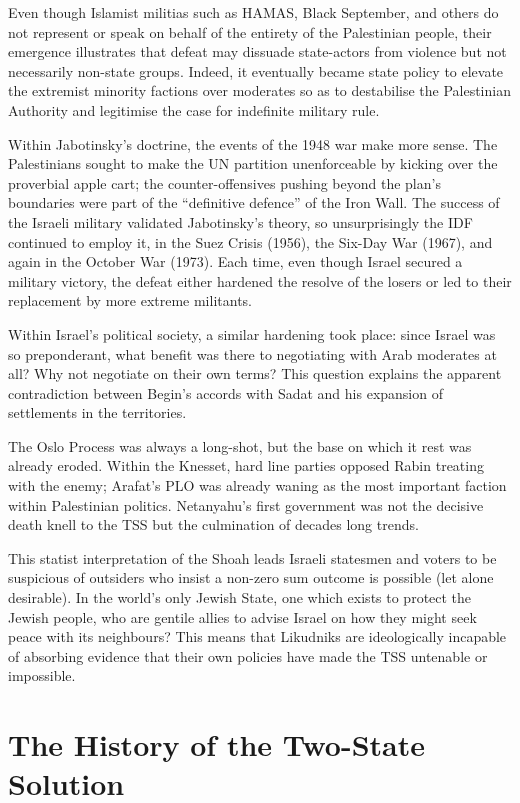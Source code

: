 \documentclass[letterpaper,12pt,twoside]{article} %
\begin{document}
\begin{multicols}{2}
Even though Islamist militias such as HAMAS, Black September, and others do not represent or speak on behalf of the entirety of the Palestinian people, their emergence illustrates that defeat may dissuade state-actors from violence but not necessarily non-state groups. Indeed, it eventually became state policy to elevate the extremist minority factions over moderates so as to destabilise the Palestinian Authority and legitimise the case for indefinite military rule.

Within Jabotinsky's doctrine, the events of the 1948 war make more sense. The Palestinians sought to make the UN partition unenforceable by kicking over the proverbial apple cart; the counter-offensives pushing beyond the plan's boundaries were part of the ``definitive defence'' of the Iron Wall. The success of the Israeli military validated Jabotinsky's theory, so unsurprisingly the IDF continued to employ it, in the Suez Crisis (1956), the Six-Day War (1967), and again in the October War (1973). Each time, even though Israel secured a military victory, the defeat either hardened the resolve of the losers or led to their replacement by more extreme militants.

Within Israel's political society, a similar hardening took place: since Israel was so preponderant, what benefit was there to negotiating with Arab moderates at all? Why not negotiate on their own terms? This question explains the apparent contradiction between Begin's accords with Sadat and his expansion of settlements in the territories.

The Oslo Process was always a long-shot, but the base on which it rest was already eroded. Within the Knesset, hard line parties opposed Rabin treating with the enemy; Arafat's PLO was already waning as the most important faction within Palestinian politics. Netanyahu's first government was not the decisive death knell to the TSS but the culmination of decades long trends.

This statist interpretation of the Shoah leads Israeli statesmen and voters to be suspicious of outsiders who insist a non-zero sum outcome is possible (let alone desirable). In the world's only Jewish State, one which exists to protect the Jewish people, who are gentile allies to advise Israel on how they might seek peace with its neighbours? This means that Likudniks are ideologically incapable of absorbing evidence that their own policies have made the TSS untenable or impossible.

\section{The History of the Two-State Solution}


\end{multicols}
\end{document}
